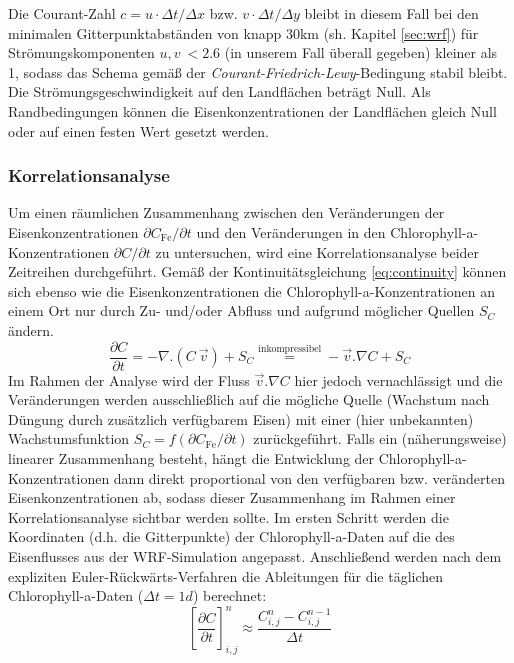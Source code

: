 \documentclass[12pt,a4paper,onecolumn]{scrartcl}
\begin{document}
Die Courant-Zahl $c = u \cdot \Delta t / \Delta x$ bzw. $v \cdot \Delta t / \Delta y$ bleibt in diesem Fall bei den minimalen Gitterpunktabständen von knapp 30km (sh. Kapitel \ref{sec:wrf}) für Strömungskomponenten $u,v \ < 2.6$ (in unserem Fall überall gegeben) kleiner als 1, sodass das Schema gemäß der \textit{Courant-Friedrich-Lewy}-Bedingung stabil bleibt. Die Strömungsgeschwindigkeit auf den Landflächen beträgt Null. Als Randbedingungen können die Eisenkonzentrationen der Landflächen gleich Null oder auf einen festen Wert gesetzt werden. 
\subsubsection{Korrelationsanalyse} \label{sec:methods_correlation}
Um einen räumlichen Zusammenhang zwischen den Veränderungen der Eisenkonzentrationen $\partial C_\text{Fe} / \partial t$ und den Veränderungen in den Chlorophyll-a-Konzentrationen $\partial C / \partial t$ zu untersuchen, wird eine Korrelationsanalyse beider Zeitreihen durchgeführt. Gemäß der Kontinuitätsgleichung \ref{eq:continuity} können sich ebenso wie die Eisenkonzentrationen die Chlorophyll-a-Konzentrationen an einem Ort nur durch Zu- und/oder Abfluss und aufgrund möglicher Quellen $S_C$ ändern.
\begin{equation}
\frac{\partial C}{\partial t} = - \nabla . (C \ \vec{v}) + S_C  \overset{\text{inkompressibel}}{=} - \vec{v}.\nabla C + S_C \label{eq:continuity}
\end{equation}
Im Rahmen der Analyse wird der Fluss $\vec{v}.\nabla C$ hier jedoch vernachlässigt und die Veränderungen werden ausschließlich auf die mögliche Quelle (Wachstum nach Düngung durch zusätzlich verfügbarem Eisen) mit einer (hier unbekannten) Wachstumsfunktion $S_C = f(\partial C_\text{Fe} / \partial t)$ zurückgeführt. Falls ein (näherungsweise) linearer Zusammenhang besteht, hängt die Entwicklung der Chlorophyll-a-Konzentrationen dann direkt proportional von den verfügbaren bzw. veränderten Eisenkonzentrationen ab, sodass dieser Zusammenhang im Rahmen einer Korrelationsanalyse sichtbar werden sollte. Im ersten Schritt werden die Koordinaten (d.h. die Gitterpunkte) der Chlorophyll-a-Daten auf die des Eisenflusses aus der WRF-Simulation angepasst. Anschließend werden nach dem expliziten Euler-Rückwärts-Verfahren die Ableitungen für die täglichen Chlorophyll-a-Daten ($\Delta t = 1d$) berechnet:
\begin{equation}
\left[\frac{\partial C}{\partial t}\right]_{i,j}^{n} \approx \frac{C_{i,j}^n-C_{i,j}^{n-1}}{\Delta t}
\end{equation}
\end{document}
